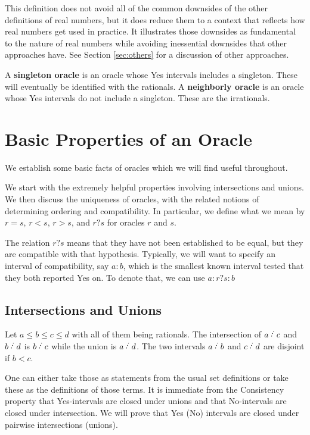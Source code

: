 \documentclass[12pt]{article}
\begin{document}
This definition does not avoid all of the common downsides of the other definitions of real numbers, but it does reduce them to a context that reflects how real numbers get used in practice. It illustrates those downsides as fundamental to the nature of real numbers while avoiding inessential downsides that other approaches have. See Section \ref{sec:others} for a discussion of other approaches.  

A \textbf{singleton oracle }is an oracle whose Yes intervals includes a singleton. These will eventually be identified with the rationals. A \textbf{neighborly oracle} is an oracle whose Yes intervals do not include a singleton. These are the irrationals. 



\section{Basic Properties of an Oracle}

We establish some basic facts of oracles which we will find useful throughout. 

We start with the extremely helpful properties involving intersections and unions. We then discuss the uniqueness of oracles, with the related notions of determining ordering and compatibility. In particular, we define what we mean by $r = s$, $r<s$, $r>s$, and $r?s$ for oracles $r$ and $s$. 

The relation $r?s$ means that they have not been established to be equal, but they are compatible with that hypothesis. Typically, we will want to specify an interval of compatibility, say $a:b$, which is the smallest known interval tested that they both reported Yes on. To denote that, we can use $a:r?s:b$ 

\subsection{Intersections and Unions}

Let $a \leq b \leq c \leq d$ with all of them being rationals. The intersection of $a\lte c$ and $b\lte d$ is $b\lte c$ while the union is $a\lte d$. The two intervals $a\lte b$ and $c\lte d$ are disjoint if $b < c$. 

One can either take those as statements from the usual set definitions or take these as the definitions of those terms. It is immediate from the Consistency property that Yes-intervals are closed under unions and that No-intervals are closed under intersection. We will prove that Yes (No) intervals are closed under pairwise intersections (unions). 
\end{document}
